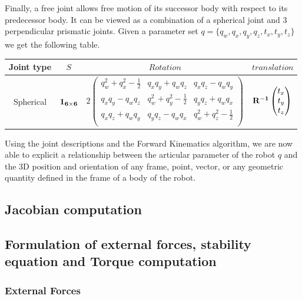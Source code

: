 Finally, a free joint allows free motion of its successor body with respect to its predecessor body.
It can be viewed as a combination of a spherical joint and 3 perpendicular prismatic joints.
Given a parameter set $q = \{ q_w, q_x, q_y, q_z, t_x, t_y, t_z\}$ we get the following table.

\begin{tabular}{|c|c|c|c|}
  \hline
  Joint type & $S$ & $Rotation$ & $translation$ \\
  \hline
  Spherical
  &
  $\bf{1}_{6\times 6}$
  &
  $2 \begin{pmatrix}
    q_w^2 +q_x^2-\frac{1}{2} & q_x q_y + q_w q_z & q_x q_z - q_w q_y \\
    q_x q_y - q_w q_z & q_w^2 +q_y^2-\frac{1}{2} & q_y q_z + q_w q_x \\
    q_x q_z + q_w q_y & q_y q_z - q_w q_x & q_w^2 +q_z^2-\frac{1}{2} \\
  \end{pmatrix}$
  &
  $\bf{R}^{-1}\begin{pmatrix}
    t_x \\ t_y \\ t_z
  \end{pmatrix}$
  \\
  \hline
\end{tabular}

Using the joint descriptions and the Forward Kinematics algorithm, we are now able to explicit a relationship between the articular parameter of the robot $q$ and the 3D position and orientation of any frame, point, vector, or any geometric quantity defined in the frame of a body of the robot.

\subsection{Jacobian computation}
\label{sub:jacobian_computation}

\subsection{Formulation of external forces, stability equation and Torque computation}
\label{sub:formulation_of_external_forces_stability_equation_and_torque_computation}

\subsubsection{External Forces}
\label{subsub:external_forces}

